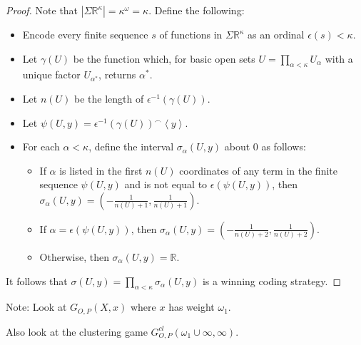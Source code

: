 \documentclass[11pt]{article}
\theoremstyle{plain}
\theoremstyle{definition}
\theoremstyle{remark}
\begin{document}
\begin{proof}
Note that $|\Sigma\mathbb{R}^\kappa| = \kappa^\omega = \kappa$. Define the following:

    \begin{itemize}
    \item Encode every finite sequence $s$ of functions in $\Sigma\mathbb{R}^{\kappa}$ as an ordinal $\epsilon(s)<\kappa$. 
    \item Let $\gamma(U)$ be the function which, for basic open sets $U=\prod_{\alpha<\kappa}U_\alpha$ with a unique factor $U_{\alpha^*}$, returns $\alpha^*$.
    \item Let $n(U)$ be the length of $\epsilon^{-1}(\gamma(U))$.
    \item Let $\psi(U,y)=\epsilon^{-1}(\gamma(U))^\frown\left<y\right>$.
    \item For each $\alpha<\kappa$, define the interval $\sigma_\alpha(U,y)$ about $0$ as follows:
        \begin{itemize}
        \item If $\alpha$ is listed in the first $n(U)$ coordinates of any term in the finite sequence $\psi(U,y)$ and is not equal to $\epsilon(\psi(U,y))$, then $\sigma_\alpha(U,y)=(-\frac{1}{n(U)+1},\frac{1}{n(U)+1})$.
        \item If $\alpha=\epsilon(\psi(U,y))$, then $\sigma_\alpha(U,y)=(-\frac{1}{n(U)+2},\frac{1}{n(U)+2})$.
        \item Otherwise, then $\sigma_\alpha(U,y)=\mathbb{R}$.
        \end{itemize}
    \end{itemize}

It follows that $\sigma(U,y)=\prod_{\alpha<\kappa} \sigma_\alpha(U,y)$ is a winning coding strategy.
\end{proof}

Note: Look at $G_{O,P}(X,x)$ where $x$ has weight $\omega_1$.

Also look at the clustering game $G^{cl}_{O,P}(\omega_1\cup\infty,\infty)$.
\end{document}
